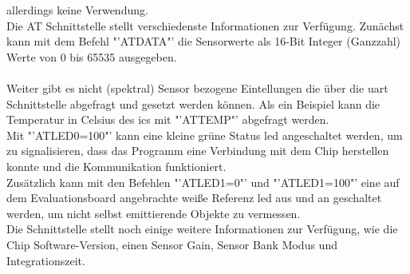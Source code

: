 \documentclass[11pt]{scrartcl}
\begin{document}
allerdings keine Verwendung.\\
Die AT Schnittstelle stellt verschiedenste Informationen zur Verfügung. Zunächst kann mit dem Befehl "'ATDATA"' die Sensorwerte als
16-Bit Integer (Ganzzahl) Werte von 0 bis 65535 ausgegeben.\\
\\
Weiter gibt es nicht (spektral) Sensor bezogene Eintellungen die über die \ac{uart} Schnittstelle abgefragt und gesetzt werden können.
Als ein Beispiel kann die Temperatur in Celsius des \ac{ic}s mit "'ATTEMP"' abgefragt werden.\\
Mit "'ATLED0=100"' kann eine kleine grüne Status \ac{led} angeschaltet werden, um zu signalisieren, dass das Programm eine Verbindung mit 
dem Chip herstellen konnte und die Kommunikation funktioniert.\\
Zusätzlich kann mit den Befehlen "'ATLED1=0"' und "'ATLED1=100"' eine auf dem Evaluationsboard angebrachte weiße Referenz \ac{led} aus und
an geschaltet werden, um nicht selbst emittierende Objekte zu vermessen.\\
Die Schnittstelle stellt noch einige weitere Informationen zur Verfügung, wie die Chip Software-Version, einen Sensor Gain, Sensor Bank Modus
und Integrationszeit.
\clearpage
\end{document}
